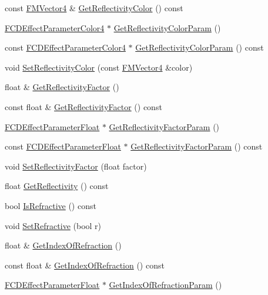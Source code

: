 \begin{DoxyCompactItemize}
\item 
const \hyperlink{classFMVector4}{FMVector4} \& \hyperlink{classFCDEffectStandard_abdd5047a0a82b40b5f13b3f666bd1c8a}{GetReflectivityColor} () const 
\item 
\hyperlink{classFCDEffectParameterAnimatableT}{FCDEffectParameterColor4} $\ast$ \hyperlink{classFCDEffectStandard_a2a69b869efe3a2d58126fff91814e157}{GetReflectivityColorParam} ()
\item 
const \hyperlink{classFCDEffectParameterAnimatableT}{FCDEffectParameterColor4} $\ast$ \hyperlink{classFCDEffectStandard_ab994ac2a861c5066cfedf435294286e3}{GetReflectivityColorParam} () const 
\item 
void \hyperlink{classFCDEffectStandard_a7da791434dd5676d6ab09c860829fb47}{SetReflectivityColor} (const \hyperlink{classFMVector4}{FMVector4} \&color)
\item 
float \& \hyperlink{classFCDEffectStandard_a45478829ccbe6b25b9f3550fc4e04c4a}{GetReflectivityFactor} ()
\item 
const float \& \hyperlink{classFCDEffectStandard_a2c2f46d7834a17771b18a3f27dab73d4}{GetReflectivityFactor} () const 
\item 
\hyperlink{classFCDEffectParameterAnimatableT}{FCDEffectParameterFloat} $\ast$ \hyperlink{classFCDEffectStandard_a1ace9e6e264bcf10bd2ac48ecb7fe11f}{GetReflectivityFactorParam} ()
\item 
const \hyperlink{classFCDEffectParameterAnimatableT}{FCDEffectParameterFloat} $\ast$ \hyperlink{classFCDEffectStandard_a0de5e4f9582f94fc413d563a6abc2fc5}{GetReflectivityFactorParam} () const 
\item 
void \hyperlink{classFCDEffectStandard_a5d44f575161556c7e32fd01db0cce3b5}{SetReflectivityFactor} (float factor)
\item 
float \hyperlink{classFCDEffectStandard_a0665515f47cf93f0df913f5d345f04c6}{GetReflectivity} () const 
\item 
bool \hyperlink{classFCDEffectStandard_a0dc0c78d14a0beb924cf7fe971ee7bda}{IsRefractive} () const 
\item 
void \hyperlink{classFCDEffectStandard_ab658aa9ac8d10afc1cd3b83abc81d571}{SetRefractive} (bool r)
\item 
float \& \hyperlink{classFCDEffectStandard_aba2edd070372a49560528d901dbf66cd}{GetIndexOfRefraction} ()
\item 
const float \& \hyperlink{classFCDEffectStandard_a749723323b4de3691eabafef079a9342}{GetIndexOfRefraction} () const 
\item 
\hyperlink{classFCDEffectParameterAnimatableT}{FCDEffectParameterFloat} $\ast$ \hyperlink{classFCDEffectStandard_a77001b0842bf3bbe4c904369a4801302}{GetIndexOfRefractionParam} ()

\end{DoxyCompactItemize}
